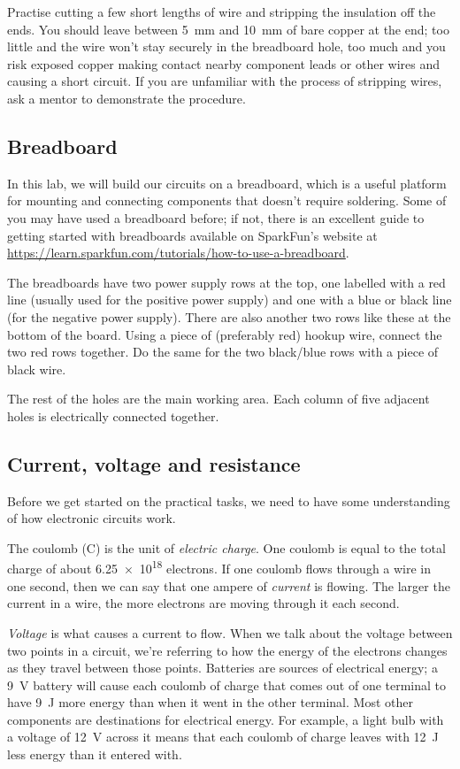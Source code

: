 \documentclass{article}
\begin{document}
Practise cutting a few short lengths of wire and stripping the insulation off
the ends. You should leave between \SI{5}{\milli\metre} and
\SI{10}{\milli\metre} of bare copper at the end; too little and the wire won't
stay securely in the breadboard hole, too much and you risk exposed copper
making contact nearby component leads or other wires and causing a short
circuit. If you are unfamiliar with the process of stripping wires, ask a
mentor to demonstrate the procedure.

\subsection{Breadboard}

In this lab, we will build our circuits on a breadboard, which is a useful
platform for mounting and connecting components that doesn't require soldering.
Some of you may have used a breadboard before; if not, there is an excellent
guide to getting started with breadboards available on SparkFun's website at
\url{https://learn.sparkfun.com/tutorials/how-to-use-a-breadboard}.

The breadboards have two power supply rows at the top, one labelled with
a red line (usually used for the positive power supply) and one with a blue or
black line (for the negative power supply). There are also another two
rows like these at the bottom of the board. Using a piece of (preferably red)
hookup wire, connect the two red rows together. Do the same for the two
black/blue rows with a piece of black wire.

The rest of the holes are the main working area. Each column of five adjacent
holes is electrically connected together.

\subsection{Current, voltage and resistance}

Before we get started on the practical tasks, we need to have some understanding
of how electronic circuits work.

The coulomb (\si{\coulomb}) is the unit of \emph{electric charge}. One coulomb
is equal to the total charge of about \num{6.25e18} electrons. If one coulomb
flows through a wire in one second, then we can say that one ampere of
\emph{current} is flowing. The larger the current in a wire, the more electrons
are moving through it each second.

\emph{Voltage} is what causes a current to flow. When we talk about the voltage
between two points in a circuit, we're referring to how the energy of the
electrons changes as they travel between those points. Batteries are sources
of electrical energy; a \SI{9}{\volt} battery will cause each coulomb of charge
that comes out of one terminal to have \SI{9}{\joule} more energy than when it
went in the other terminal. Most other components are destinations for
electrical energy. For example, a light bulb with a voltage of \SI{12}{\volt}
across it means that each coulomb of charge leaves with \SI{12}{\joule} less
energy than it entered with.
\end{document}
